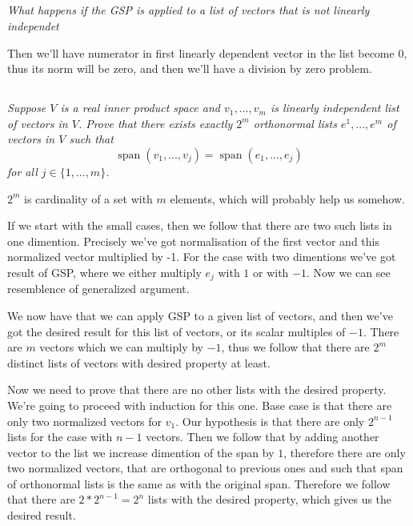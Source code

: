 \documentclass[11pt,oneside,titlepage]{book}
\DeclareMathOperator \Span {span}
\begin{document}
\subsection{}

\textit{What happens if the GSP is applied to a list of vectors that is not linearly independet}

Then we'll have numerator in first linearly dependent vector in the list become $0$, thus its
norm will be zero, and then we'll have a division by zero problem.

\subsection{}

\textit{Suppose $V$ is a real inner product space and $v_1, ..., v_m$ is linearly independent list
  of vectors in $V$. Prove that there exists exactly $2^m$ orthonormal lists $e^1, ..., e^m$
  of vectors in $V$ such that }
$$\Span(v_1, ..., v_j) = \Span(e_1, ..., e_j) $$
\textit{for all $j \in \{1, ..., m\}$.}

$2^m$ is cardinality of a set with $m$ elements, which will probably help us somehow.

If we start with the small cases, then we follow that there are two such lists in one dimention.
Precisely we've got normalisation of the first vector and this normalized vector multiplied by -1.
For the case with two dimentions we've got result of GSP, where we either multiply $e_j$ with
$1$ or with $-1$. Now we can see resemblence of generalized argument.

We now have that we can apply GSP to a given list of vectors, and then we've got the desired result
for this list of vectors, or its scalar multiples of $-1$. There are $m$ vectors which we
can multiply by $-1$, thus we follow that there are $2^m$ distinct lists of vectors with desired
property at least.

Now we need to prove that there are no other lists with the desired property. We're going to
proceed with induction for this one. Base case is that there are only two normalized vectors
for $v_1$. Our hypothesis is that there are only  $2^{n - 1}$ lists for the case with $n - 1$
vectors. Then we follow that by adding another vector to the list we increase dimention
of the span by $1$, therefore there are only two normalized vectors, that are orthogonal to
previous ones and such that span of orthonormal lists is the same as with the original span.
Therefore we follow that there are $2 * 2^{n - 1} = 2^n$ lists with the desired property,
which gives us the desired result.
\end{document}
